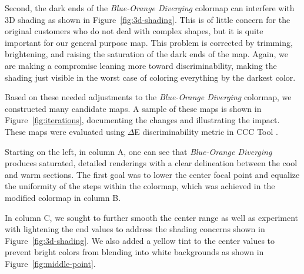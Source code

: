 \documentclass{IEEEcsmag}
\newcommand*{\fix}[1]{\textbf{\emph{\textcolor{red}{#1}}}}
\newcommand*{\colormap}[1]{\textsl{#1}\xspace}
\newcommand*{\huewheel}{\colormap{Hue Wheel}}
\newcommand*{\coolwarm}{\colormap{Cool to Warm}}
\newcommand*{\blueorange}{\colormap{Blue-Orange Diverging}}
\newcommand*{\fast}{\colormap{Fast}}
\begin{document}
Second, the dark ends of the \blueorange colormap can interfere with 3D shading as shown in Figure~\ref{fig:3d-shading}.
This is of little concern for the original customers who do not deal with complex shapes, but it is quite important for our general purpose map.
This problem is corrected by trimming, brightening, and raising the saturation of the dark ends of the map.
Again, we are making a compromise leaning more toward discriminability, making the shading just visible in the worst case of coloring everything by the darkest color.

Based on these needed adjustments to the \blueorange colormap, we constructed many candidate maps.
A sample of these maps is shown in Figure~\ref{fig:iterations}, documenting the changes and illustrating 
the impact. These maps were evaluated using $\Delta$E discriminability metric in CCC Tool \cite{Nardini2021}.

Starting on the left, in column A, one can see that \blueorange produces saturated, detailed renderings with a clear delineation between the cool and warm sections.
The first goal was to lower the center focal point and equalize the uniformity of the steps within the colormap, which was achieved in the modified colormap in column B.

In column C, we sought to further smooth the center range as well as experiment with lightening the end values to address the shading concerns shown in Figure~\ref{fig:3d-shading}.
We also added a yellow tint to the center values to prevent bright colors from blending into white backgrounds as shown in Figure~\ref{fig:middle-point}.
\end{document}
